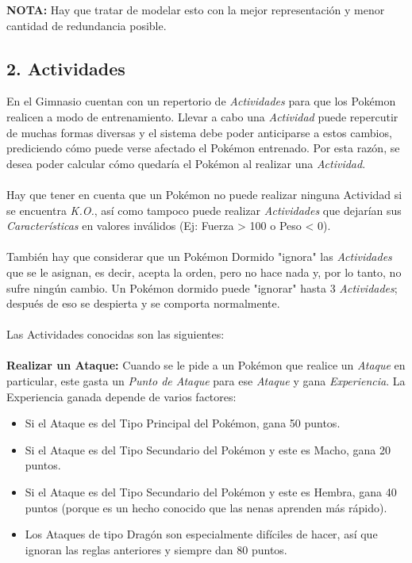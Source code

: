 \documentclass[spanish,a4paper]{article}
\begin{document}
\textbf{NOTA:} Hay que tratar de modelar esto con la mejor representación y menor cantidad de redundancia posible.

\subsection*{2. Actividades}

En el Gimnasio cuentan con un repertorio de \textit{Actividades} para que los Pokémon realicen a modo de entrenamiento. 
Llevar a cabo una \textit{Actividad} puede repercutir de muchas formas diversas y el sistema debe poder anticiparse a estos cambios, prediciendo cómo puede verse afectado el Pokémon entrenado. 
Por esta razón, se desea poder calcular cómo quedaría el Pokémon al realizar una \textit{Actividad}.
\\\\
Hay que tener en cuenta que un Pokémon no puede realizar ninguna Actividad si se encuentra \textit{K.O.}, así como tampoco puede realizar \textit{Actividades} que dejarían sus \textit{Características} en valores inválidos (Ej: Fuerza > 100 o Peso < 0).
\\\\
También hay que considerar que un Pokémon Dormido "ignora" las \textit{Actividades} que se le asignan, es decir, acepta la orden, pero no hace nada y, por lo tanto, no sufre ningún cambio. 
Un Pokémon dormido puede "ignorar" hasta 3 \textit{Actividades}; después de eso se despierta y se comporta normalmente.
\\\\
Las Actividades conocidas son las siguientes:
\\\\
\textbf{Realizar un Ataque:}\newline
Cuando se le pide a un Pokémon que realice un \textit{Ataque} en particular, este gasta un \textit{Punto de Ataque} para ese \textit{Ataque} y gana \textit{Experiencia}. 
La Experiencia ganada depende de varios factores:
\begin{itemize}
 \item Si el Ataque es del Tipo Principal del Pokémon, gana 50 puntos.
 \item Si el Ataque es del Tipo Secundario del Pokémon y este es Macho, gana 20 puntos.
 \item Si el Ataque es del Tipo Secundario del Pokémon y este es Hembra, gana 40 puntos (porque es un hecho conocido que las nenas aprenden más rápido).
 \item Los Ataques de tipo Dragón son especialmente difíciles de hacer, así que ignoran las reglas anteriores y siempre dan 80 puntos.
\end{itemize}
\end{document}
